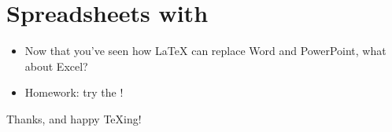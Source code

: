 \documentclass{beamer}
\begin{document}
\section{Spreadsheets with \protect{}}

\begin{frame}[fragile]{\insertsection}
\begin{itemize}
\item Now that you've seen how \LaTeX{} can replace Word and PowerPoint, what
about Excel?
\item Homework: try the !
\end{itemize}
\end{frame}

\begin{frame}
\begin{center}
Thanks, and happy \TeX{}ing!
\end{center}
\end{frame}
\end{document}
